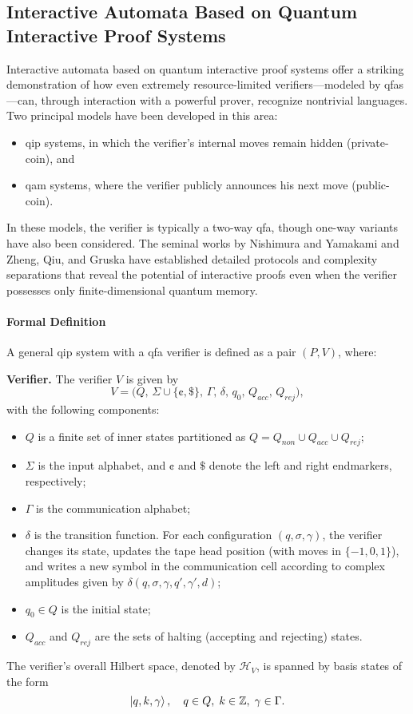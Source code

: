 \subsection{Interactive Automata Based on Quantum Interactive Proof Systems}
\label{sec:interactive-automata}

Interactive automata based on quantum interactive proof systems offer a striking demonstration of how even extremely resource-limited verifiers—modeled by \glspl{qfa}—can, through interaction with a powerful prover, recognize nontrivial languages. Two principal models have been developed in this area:
  
\begin{itemize}
  \item \gls{qip} systems, in which the verifier's internal moves remain hidden (private-coin), and
  \item \gls{qam} systems, where the verifier publicly announces his next move (public-coin).
\end{itemize}

In these models, the verifier is typically a two-way qfa, though one-way variants have also been considered. The seminal works by Nishimura and Yamakami \cite{nishimura2009application, nishimura2015interactive} and Zheng, Qiu, and Gruska \cite{zheng2015power} have established detailed protocols and complexity separations that reveal the potential of interactive proofs even when the verifier possesses only finite-dimensional quantum memory.

\paragraph{Formal Definition}
A general \gls{qip} system with a qfa verifier is defined as a pair $(P,V)$, where:

\textbf{Verifier.} The verifier $V$ is given by
\[
V = \bigl(Q,\, \Sigma \cup \{\cent,\$\},\, \Gamma,\, \delta,\, q_0,\, Q_{acc},\, Q_{rej}\bigr),
\]
with the following components:
\begin{itemize}
  \item $Q$ is a finite set of inner states partitioned as $Q = Q_{non} \cup Q_{acc} \cup Q_{rej}$;
  \item $\Sigma$ is the input alphabet, and $\cent$ and $\$$ denote the left and right endmarkers, respectively;
  \item $\Gamma$ is the communication alphabet;
  \item $\delta$ is the transition function. For each configuration $(q,\sigma,\gamma)$, the verifier changes its state, updates the tape head position (with moves in $\{-1,0,1\}$), and writes a new symbol in the communication cell according to complex amplitudes given by $\delta(q,\sigma,\gamma,q',\gamma',d)$;
  \item $q_0\in Q$ is the initial state;
  \item $Q_{acc}$ and $Q_{rej}$ are the sets of halting (accepting and rejecting) states.
\end{itemize}
The verifier's overall Hilbert space, denoted by $\mathit{\mathcal{H}}_V$, is spanned by basis states of the form
\[
\ket{q, k, \gamma},\quad q\in Q,\; k\in \mathbb{Z},\; \gamma\in\Gamma.
\]

